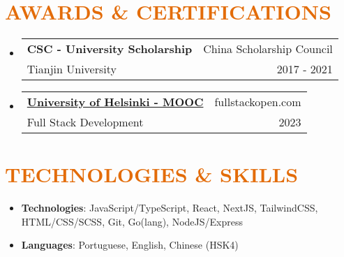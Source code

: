 \documentclass[a4paper, 20pt]{article}
\makeatletter
\newcommand{\resumeItem}[2]{
  \item\small{
    \textbf{#1}{: #2 \vspace{-2pt}}
  }
}
\newcommand{\resumeSubheading}[4]{
  \vspace{-1pt}\item
    \begin{tabular*}{0.97\textwidth}{l@{\extracolsep{\fill}}r}
      \textbf{#1} & #2 \\
      #3 & #4 \\
    \end{tabular*}\vspace{-5pt}
}
\newcommand{\resumeSubItem}[2]{\resumeItem{#1}{#2}\vspace{-3pt}}
\newcommand{\resumeSubHeadingListStart}{\begin{itemize}[leftmargin=*]}
\newcommand{\resumeSubHeadingListEnd}{\end{itemize}}
\makeatother
\begin{document}
\begin{CJK*}{UTF8}{gbsn}
\vspace{5pt}
\section{\textcolor[HTML]{E36C09}{\textbf{AWARDS \& CERTIFICATIONS}}}
\resumeSubHeadingListStart{}
\resumeSubheading{CSC - University Scholarship}{China Scholarship Council}
{Tianjin University}{2017 - 2021}
\resumeSubheading{\href{https://studies.cs.helsinki.fi/stats/api/certificate/fullstackopen/en/c54941f0ecb4d052a3cf6982d1d27398}{University of Helsinki - MOOC}}{fullstackopen.com}
{Full Stack Development}{2023}
\resumeSubHeadingListEnd{}

\vspace{5pt}
\section{\textcolor[HTML]{E36C09}{\textbf{TECHNOLOGIES \& SKILLS}}}
\resumeSubHeadingListStart{}
	  \resumeSubItem{Technologies}{\quad JavaScript/TypeScript, React, NextJS, TailwindCSS, HTML/CSS/SCSS, Git, Go(lang), NodeJS/Express}
	  \resumeSubItem{Languages}{\quad Portuguese, English, Chinese (HSK4)}
    \resumeSubHeadingListEnd{}


\vspace{5pt}

\end{CJK*}
\end{document}
